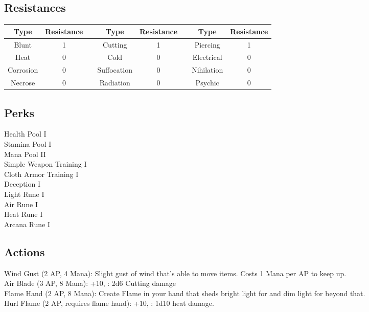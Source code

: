 \subsection{Resistances}
\begin{minipage}[H]{1\textwidth}
	\centering
	\begin{tabular}[c]{|c | c | c | c | c | c | c | c|}
		\hline
		Type & Resistance && Type & Resistance && Type & Resistance\\
		\hline
		Blunt & 1 &&
		Cutting & 1 &&
		Piercing & 1\\
		Heat & 0 &&
		Cold & 0 &&
		Electrical & 0\\
		Corrosion & 0 &&
		Suffocation & 0 &&
		Nihilation & 0 \\
		Necrose & 0 &&
		Radiation & 0 &&
		Psychic & 0\\
		\hline
	\end{tabular}
\end{minipage}

\subsection{Perks}
Health Pool I\\
Stamina Pool I\\
Mana Pool II\\
Simple Weapon Training I\\
Cloth Armor Training I\\
Deception I\\
Light Rune I\\
Air Rune I\\
Heat Rune I\\
Arcana Rune I\\

\subsection{Actions}
Wind Gust (2 AP, 4 Mana): Slight gust of wind that's able to move items.
Costs 1 Mana per AP to keep up.\\

Air Blade (3 AP, 8 Mana): +10, : 2d6 Cutting damage\\

Flame Hand (2 AP, 8 Mana): Create Flame in your hand that sheds bright light for  and dim light for  beyond that.\\

Hurl Flame (2 AP, requires flame hand): +10, : 1d10 heat damage.\\

